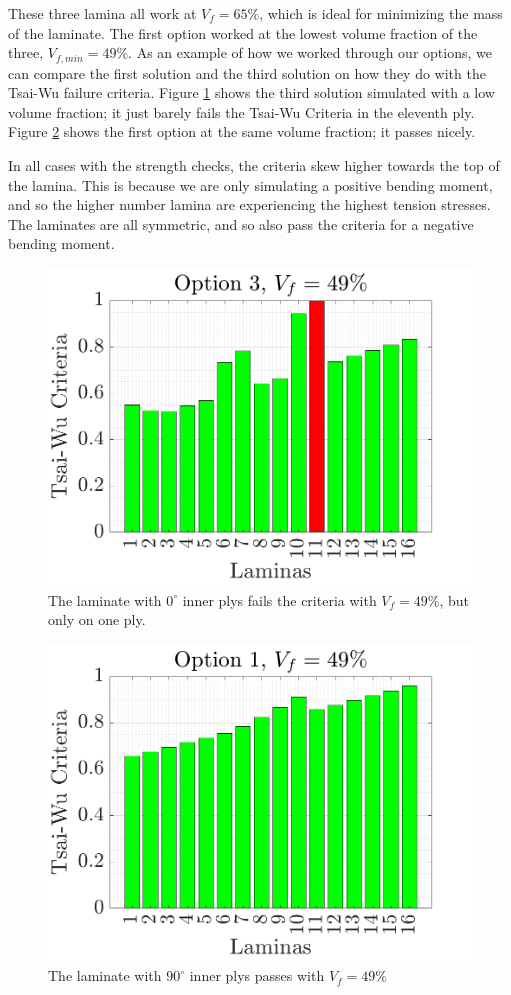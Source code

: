 \documentclass[12pt]{article}
\begin{document}
These three lamina all work at $V_f = 65\%$, which is ideal for minimizing the mass of the laminate. The first option worked at the lowest volume fraction of the three, $V_{f,min} = 49\%$. As an example of how we worked through our options, we can compare the first solution and the third solution on how they do with the Tsai-Wu failure criteria. Figure \ref{fig:op3} shows the third solution simulated with a low volume fraction; it just barely fails the Tsai-Wu Criteria in the eleventh ply. Figure \ref{fig:strong} shows the first option at the same volume fraction; it passes nicely. 

In all cases with the strength checks, the criteria skew higher towards the top of the lamina. This is because we are only simulating a positive bending moment, and so the higher number lamina are experiencing the highest tension stresses. The laminates are all symmetric, and so also pass the criteria for a negative bending moment.

\begin{figure}[H]
    \centering
    \includegraphics[width=0.75\linewidth]{op3fails.png}
    \caption{The laminate with $0^\circ$ inner plys fails the criteria with $V_f = 49\%$, but only on one ply.}
    \label{fig:op3}
\end{figure}

\begin{figure}[H]
    \centering
    \includegraphics[width=0.75\linewidth]{stronglaminate.png}
    \caption{The laminate with $90^\circ$ inner plys passes with $V_f = 49\%$}
    \label{fig:strong}
\end{figure}
\end{document}

